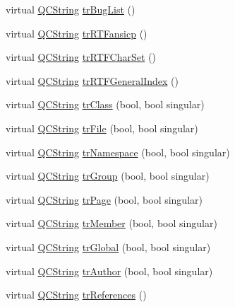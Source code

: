 \begin{DoxyCompactItemize}
virtual \mbox{\hyperlink{class_q_c_string}{Q\+C\+String}} \mbox{\hyperlink{class_translator_korean_a0ce4e429855d853b7b88f51380c7f788}{tr\+Bug\+List}} ()
\item 
virtual \mbox{\hyperlink{class_q_c_string}{Q\+C\+String}} \mbox{\hyperlink{class_translator_korean_a9f814151d64327b59b1819e756329d9f}{tr\+R\+T\+Fansicp}} ()
\item 
virtual \mbox{\hyperlink{class_q_c_string}{Q\+C\+String}} \mbox{\hyperlink{class_translator_korean_abc7c0238b498ea5bf2a6c9aeafac207d}{tr\+R\+T\+F\+Char\+Set}} ()
\item 
virtual \mbox{\hyperlink{class_q_c_string}{Q\+C\+String}} \mbox{\hyperlink{class_translator_korean_a65b285ca91229329881bde2ac0febcd2}{tr\+R\+T\+F\+General\+Index}} ()
\item 
virtual \mbox{\hyperlink{class_q_c_string}{Q\+C\+String}} \mbox{\hyperlink{class_translator_korean_a47f5df8924d85212293da8f90b15c38f}{tr\+Class}} (bool, bool singular)
\item 
virtual \mbox{\hyperlink{class_q_c_string}{Q\+C\+String}} \mbox{\hyperlink{class_translator_korean_aa4c52e8d32d016b14a77cff015f9c9ee}{tr\+File}} (bool, bool singular)
\item 
virtual \mbox{\hyperlink{class_q_c_string}{Q\+C\+String}} \mbox{\hyperlink{class_translator_korean_aa12d74e00aee44683191bb6f0e20b50d}{tr\+Namespace}} (bool, bool singular)
\item 
virtual \mbox{\hyperlink{class_q_c_string}{Q\+C\+String}} \mbox{\hyperlink{class_translator_korean_abb8abbd3d17b2c6b9052eb9dc1ba31f0}{tr\+Group}} (bool, bool singular)
\item 
virtual \mbox{\hyperlink{class_q_c_string}{Q\+C\+String}} \mbox{\hyperlink{class_translator_korean_a25d4e603ab21d42defd20e0caf6932cf}{tr\+Page}} (bool, bool singular)
\item 
virtual \mbox{\hyperlink{class_q_c_string}{Q\+C\+String}} \mbox{\hyperlink{class_translator_korean_a7de68f427722af2148122f7863b099d2}{tr\+Member}} (bool, bool singular)
\item 
virtual \mbox{\hyperlink{class_q_c_string}{Q\+C\+String}} \mbox{\hyperlink{class_translator_korean_a825ad7820d84629c6c64aeaceb38ac88}{tr\+Global}} (bool, bool singular)
\item 
virtual \mbox{\hyperlink{class_q_c_string}{Q\+C\+String}} \mbox{\hyperlink{class_translator_korean_a7a9cc0313f8ad406e6339ea01dd05562}{tr\+Author}} (bool, bool singular)
\item 
virtual \mbox{\hyperlink{class_q_c_string}{Q\+C\+String}} \mbox{\hyperlink{class_translator_korean_a3364d5730272c08985751784a44eb24b}{tr\+References}} ()

\end{DoxyCompactItemize}
